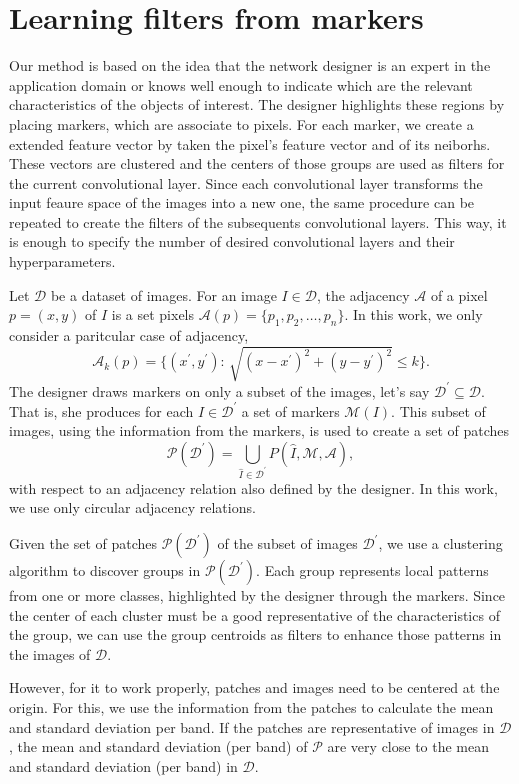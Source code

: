 \documentclass[a4paper,conference]{IEEEtran}
\newcommand{\A}{\mathcal{A}}
\newcommand{\D}{\mathcal{D}}
\newcommand{\I}{\hat{I}}
\newcommand{\M}{\mathcal{M}}
\newcommand{\Pa}{\mathcal{P}}
\newcommand{\pDD}{\D^\prime}
\begin{document}
\section{Learning filters from markers}
Our method is based on the idea that the network designer is an expert in the application domain or knows well enough to indicate which are the relevant characteristics of the objects of interest. The designer highlights these regions by placing markers, which are associate to pixels. For each marker, we create a extended feature vector by taken the pixel's feature vector and of its neiborhs. These vectors are clustered and the centers of those groups are used as filters for the current convolutional layer. Since each convolutional layer transforms the input feaure space of the images into a new one, the same procedure can be repeated to create the filters of the subsequents convolutional layers. This way, it is enough to specify the number of desired convolutional layers and their hyperparameters. 

Let $\D$ be a dataset of images. For an image $I \in \D$, the adjacency $\A$ of a pixel $p = (x, y)$ of $I$ is a set pixels $\A(p) = \{ p_1, p_2, \ldots, p_n \}$. In this work, we only consider a paritcular case of adjacency, 
\[\A_k(p) = \{(x^\prime, y^\prime) :\, \sqrt{(x - x^\prime)^2 + (y - y^\prime)^2} \le k\}.\]
The designer draws markers on only a subset of the images, let's say $\pDD \subseteq \D$. That is, she produces for each $I \in \pDD$ a set of markers $\M(I)$.  This subset of images, using the information from the markers, is used to create a set of patches \[\Pa(\pDD) = \bigcup_{\I \in \pDD}{P(\I, \M, \A)},\] with respect to an adjacency relation also defined by the designer. In this work, we use only circular adjacency relations.

Given the set of patches $\Pa(\pDD)$ of the subset of images $\pDD$, we use a clustering algorithm to discover groups in $\Pa(\pDD)$. Each group represents local patterns from one or more classes, highlighted by the designer through the markers. Since the center of each cluster must be a good representative of the characteristics of the group, we can use the group centroids as filters to enhance those patterns in the images of $\D$.

However, for it to work properly, patches and images need to be centered at the origin. For this, we use the information from the patches to calculate the mean and standard deviation per band. If the patches are representative of images in $\D$, the mean and standard deviation (per band) of $\Pa$ are very close to the mean and standard deviation (per band) in $\D$.
\end{document}
